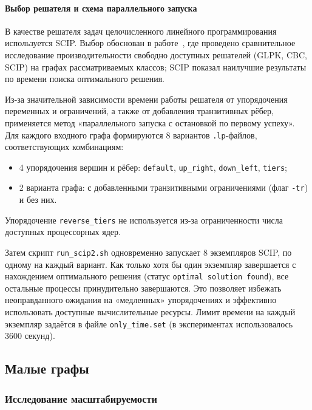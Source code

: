 \paragraph{Выбор решателя и схема параллельного запуска}
\label{subsec:paral}

В качестве решателя задач целочисленного линейного программирования используется SCIP. Выбор обоснован в работе~\cite{Senyushkina2025}, где проведено сравнительное исследование производительности свободно доступных решателей (GLPK, CBC, SCIP) на графах рассматриваемых классов; SCIP показал наилучшие результаты по времени поиска оптимального решения.

Из-за значительной зависимости времени работы решателя от упорядочения переменных и ограничений, а также от добавления транзитивных рёбер, применяется метод «параллельного запуска с остановкой по первому успеху». Для каждого входного графа формируются 8 вариантов \texttt{.lp}-файлов, соответствующих комбинациям:
\begin{itemize}
	\item 4 упорядочения вершин и рёбер: \texttt{default}, \texttt{up\_right}, \texttt{down\_left}, \texttt{tiers};
	\item 2 варианта графа: с добавленными транзитивными ограничениями (флаг \texttt{-tr}) и без них.
\end{itemize}
Упорядочение \texttt{reverse\_tiers} не используется из-за ограниченности числа доступных процессорных ядер.

Затем скрипт \texttt{run\_scip2.sh} одновременно запускает 8 экземпляров SCIP, по одному на каждый вариант. Как только хотя бы один экземпляр завершается с нахождением оптимального решения (статус \texttt{optimal solution found}), все остальные процессы принудительно завершаются. Это позволяет избежать неоправданного ожидания на «медленных» упорядочениях и эффективно использовать доступные вычислительные ресурсы. Лимит времени на каждый экземпляр задаётся в файле \texttt{only\_time.set} (в экспериментах использовалось 3600 секунд).

\subsection*{Малые графы}

\subsubsection*{Исследование масштабируемости}

